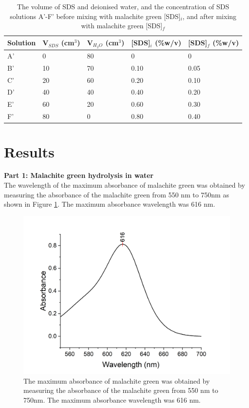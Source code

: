 \documentclass[twocolumn]{article} %
\begin{document}
\begin{table}[h]
    \caption{The volume of SDS and deionised water, and the concentration of SDS solutions A'-F' before mixing with malachite green [SDS]$_i$, and after mixing with malachite green [SDS]$_f$}
    \label{NaOHSDS}
    \begin{tabular}{L{0.4in}C{0.7in}C{0.7in}C{0.6in}C{0.6in}}\toprule
        Solution & V$_{SDS}$ (cm$^3$)& V$_{H_2O}$ (cm$^3$)& [SDS]$_i$ (\%w/v)& [SDS]$_f$ (\%w/v)\\\midrule
        A' & 0 & 80 & 0 & 0\\
        B' & 10 & 70 &0.10 & 0.05\\
        C' & 20&60&0.20 & 0.10\\
        D' &40&40& 0.40  & 0.20\\
        E' & 60&20&0.60 & 0.30 \\
        F' & 80&0&0.80 & 0.40\\\bottomrule
   \end{tabular}
\end{table}



\section{Results}  


\textbf{Part 1: Malachite green hydrolysis in water}\\

The wavelength of the maximum absorbance of malachite green was obtained by measuring the absorbance of the malachite green from 550 nm to 750nm as shown in Figure \ref{maximumMG}. The maximum absorbance wavelength was 616 nm.

\begin{figure}[H]
    \centering
    \includegraphics[width=\columnwidth]{max A of MG (1).png}
    \caption{The maximum absorbance of malachite green was obtained by measuring the absorbance of the malachite green from 550 nm to 750nm. The maximum absorbance wavelength was 616 nm.}
    \label{maximumMG}
\end{figure}
\end{document}
